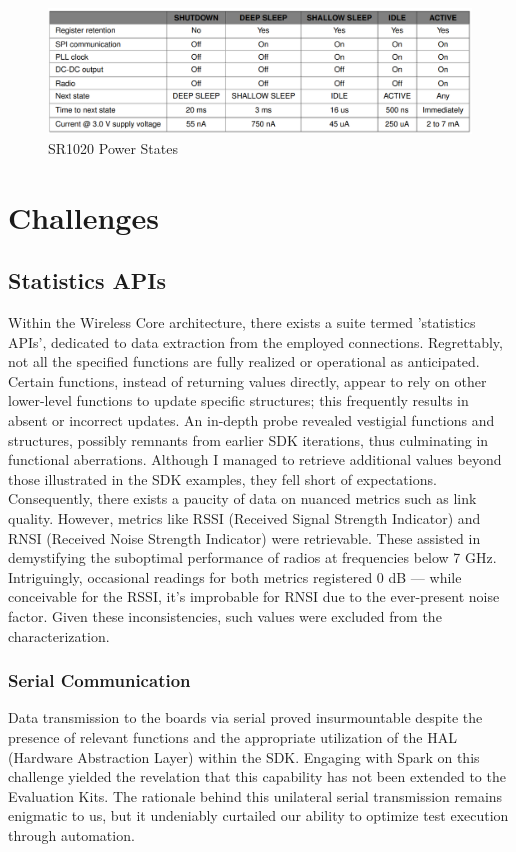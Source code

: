 \begin{figure}[h]
\centering
\includegraphics[width=\textwidth]{images/power states datasheet.png}
\caption{SR1020 Power States}
\label{fig:power_states}
\end{figure}


\section{Challenges}
\subsection{Statistics APIs}
Within the Wireless Core architecture, there exists a suite termed 'statistics APIs', dedicated to data extraction from the employed connections. Regrettably, not all the specified functions are fully realized or operational as anticipated. Certain functions, instead of returning values directly, appear to rely on other lower-level functions to update specific structures; this frequently results in absent or incorrect updates. An in-depth probe revealed vestigial functions and structures, possibly remnants from earlier SDK iterations, thus culminating in functional aberrations. Although I managed to retrieve additional values beyond those illustrated in the SDK examples, they fell short of expectations. Consequently, there exists a paucity of data on nuanced metrics such as link quality. However, metrics like RSSI (Received Signal Strength Indicator) and RNSI (Received Noise Strength Indicator) were retrievable. These assisted in demystifying the suboptimal performance of radios at frequencies below 7 GHz. Intriguingly, occasional readings for both metrics registered 0 dB — while conceivable for the RSSI, it's improbable for RNSI due to the ever-present noise factor. Given these inconsistencies, such values were excluded from the characterization.

\subsubsection{Serial Communication}
Data transmission to the boards via serial proved insurmountable despite the presence of relevant functions and the appropriate utilization of the HAL (Hardware Abstraction Layer) within the SDK. Engaging with Spark on this challenge yielded the revelation that this capability has not been extended to the Evaluation Kits. The rationale behind this unilateral serial transmission remains enigmatic to us, but it undeniably curtailed our ability to optimize test execution through automation.

